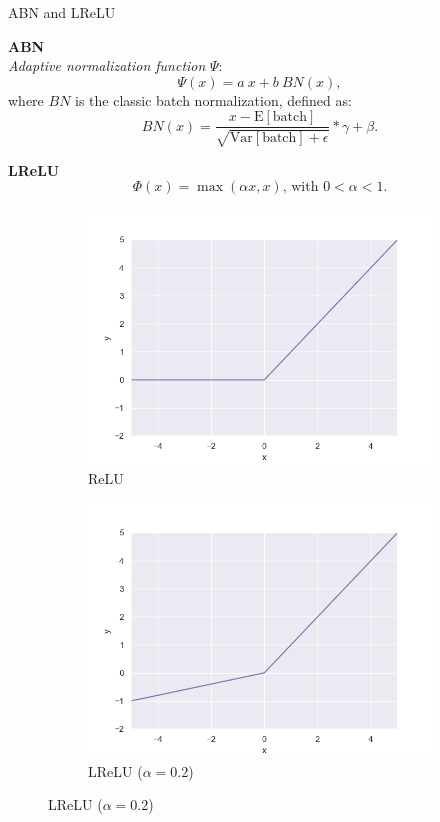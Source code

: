 \documentclass[9pt]{beamer}
\begin{document}
\begin{frame}{ABN and LReLU}

\textbf{ABN}\\
\textit{Adaptive normalization function} $\Psi$:
    $$\Psi(x)=a\ x+b\ BN(x),$$
where $BN$ is the classic batch normalization, defined as:
    $$BN(x) = \frac{x-\mathrm{E}[\text{batch}]}{\sqrt{\mathrm{Var}[\text{batch}]+\epsilon}}*\gamma+\beta.$$

\textbf{LReLU}\\
$$\Phi(x)=\max(\alpha x,x)\mbox{, with } 0<\alpha<1.$$
\begin{figure}[!ht]
    \begin{subfigure}{.4\linewidth}
        \centering
        \includegraphics[width=\linewidth]{pics/act-relu.png}
        \caption{ReLU}
    \end{subfigure}
    \begin{subfigure}{.4\linewidth}
        \centering
        \includegraphics[width=\linewidth]{pics/act-lrelu.png}
        \caption{LReLU ($\alpha=0.2$)}
    \end{subfigure}
\end{figure}
\end{frame}
\end{document}
